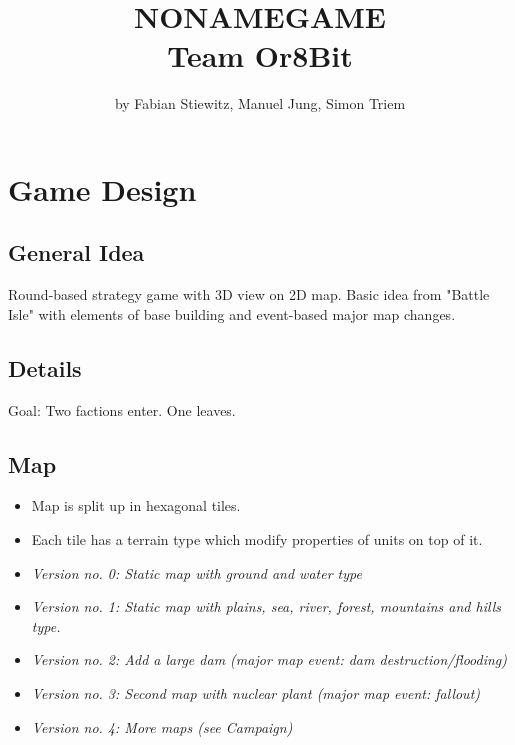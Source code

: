 \documentclass[
	fontsize=12pt,
    paper=a4,
    pagesize=auto,
    parskip=half,
    titlepage=on,
    ngerman
]{scrartcl}
\begin{document}
	
\title{
    NONAMEGAME\\
	Team Or8Bit
}
\subtitle{
  by Fabian Stiewitz, Manuel Jung, Simon Triem
}

\maketitle

\newpage

\tableofcontents

\newpage

\section{Game Design}

\subsection{General Idea}

    Round-based strategy game with 3D view on 2D map. Basic idea from "Battle Isle" with elements of base building and
    event-based major map changes.

\subsection{Details}

  Goal: Two factions enter. One leaves.

\subsection{Map}
  \begin{itemize}
  	\item Map is split up in hexagonal tiles.
  	\item Each tile has a terrain type which modify properties of units on top of it.
  	\item \textit{Version no. 0: Static map with ground and water type}
  	\item \textit{Version no. 1: Static map with plains, sea, river, forest, mountains and hills type.}
  	\item \textit{Version no. 2: Add a large dam (major map event: dam destruction/flooding)}
    \item \textit{Version no. 3: Second map with nuclear plant (major map event: fallout)}
  	\item \textit{Version no. 4: More maps (see Campaign)}
  \end{itemize}
\end{document}
